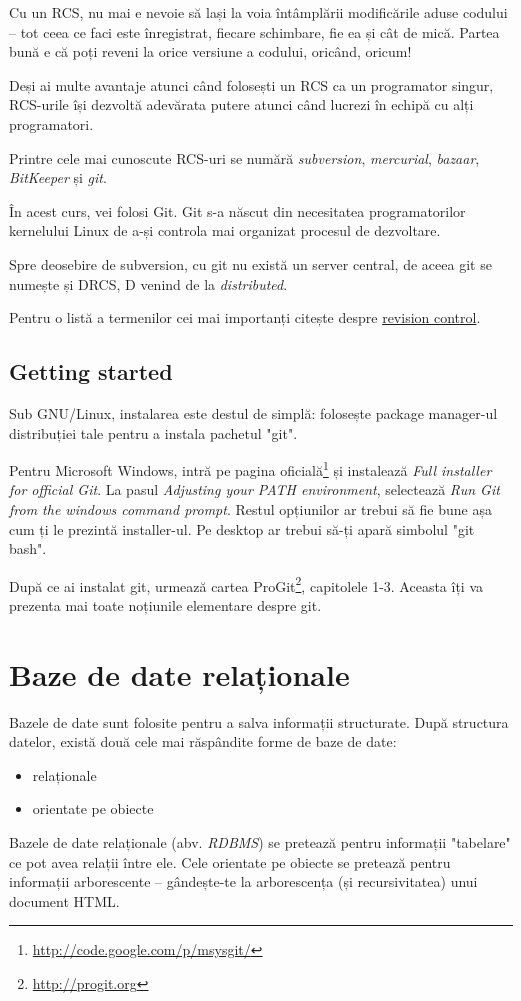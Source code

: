 Cu un RCS, nu mai e nevoie să lași la voia întâmplării modificările
aduse codului -- tot ceea ce faci este înregistrat, fiecare schimbare,
fie ea și cât de mică. Partea bună e că poți reveni la orice versiune
a codului, oricând, oricum!

Deși ai multe avantaje atunci când folosești un RCS ca un programator singur,
RCS-urile își dezvoltă adevărata putere atunci când lucrezi în echipă
cu alți programatori.

Printre cele mai cunoscute RCS-uri se numără \textit{subversion},
\textit{mercurial}, \textit{bazaar}, \textit{BitKeeper} și \textit{git}.

În acest curs, vei folosi Git. Git s-a născut din necesitatea
programatorilor kernelului Linux de a-și controla mai organizat
procesul de dezvoltare.

Spre deosebire de subversion, cu git nu există un server central,
de aceea git se numește și DRCS, D venind de la \textsl{distributed}.

Pentru o listă a termenilor cei mai importanți citește despre
\href{http://en.wikipedia.org/wiki/Revision_control}{revision control}.

\subsection{Getting started}
Sub GNU/Linux, instalarea este destul de simplă: folosește
package manager-ul distribuției tale pentru a instala pachetul "git".

Pentru Microsoft Windows,
intră pe pagina oficială\footnote{\url{http://code.google.com/p/msysgit/}}
și instalează \textit{Full installer for official Git}. La pasul
\textit{Adjusting your PATH environment}, selectează \textit{Run
Git from the windows command prompt}. Restul opțiunilor ar trebui
să fie bune așa cum ți le prezintă installer-ul. Pe desktop ar trebui
să-ți apară simbolul "git bash".

După ce ai instalat git, urmează cartea ProGit\footnote{\url{http://progit.org}},
capitolele 1-3. Aceasta îți va prezenta mai toate noțiunile elementare
despre git.



\section{Baze de date relaționale}
Bazele de date sunt folosite pentru a salva informații structurate.
După structura datelor, există două cele mai răspândite forme de
baze de date:
\begin{itemize}
\item relaționale
\item orientate pe obiecte
\end{itemize}
Bazele de date relaționale (abv. \textsl{RDBMS}) se pretează pentru informații "tabelare"
ce pot avea relații între ele. Cele orientate pe obiecte se pretează
pentru informații arborescente -- gândește-te la arborescența
(și recursivitatea) unui document HTML.



